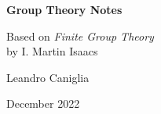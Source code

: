 \documentclass[openany]{book}
\author{Leandro Caniglia}
\date{December 2022}
\begin{document}
\begin{titlepage}
    \centering
    \vfill %
    
    {\fontsize{33}{40}\selectfont \bfseries Group Theory Notes\par}
    \vspace{0.6cm}
    
    {\fontsize{19}{24}\selectfont Based on {\slshape Finite Group Theory}\\ by {I.} Martin Isaacs\par}
    \vspace{2.5cm}
    
    {\Large Leandro Caniglia\par}
    \vspace{0.3cm}
    
    {\large December 2022\par}
    
    \vfill %
\end{titlepage}
\let\cleardoublepage\clearpage
\frontmatter
{}
{}
\tableofcontents
\mainmatter
\setlength{\parindent}{0pt}






\appendix



\end{document}
